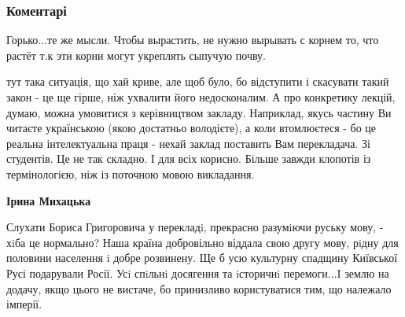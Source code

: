 
 
 
 
 
\subsubsection{Коментарі}
\label{sec:15_07_2021.fb.hersonskij_boris.1.mova_ksu_mnenie.cmt}

\begin{itemize}
 

Горько...те же мысли. Чтобы вырастить, не нужно вырывать с корнем то, что
растёт т.к эти корни могут укреплять сыпучую почву.


 

тут така ситуація, що хай криве, але щоб було, бо відступити і скасувати такий
закон - це ще гірше, ніж ухвалити його недосконалим. А про конкретику лекцій,
думаю, можна умовитися з керівництвом закладу. Наприклад, якусь частину Ви
читаєте українською (якою достатньо володієте), а коли втомлюєтеся - бо це
реальна інтелектуальна праця - нехай заклад поставить Вам перекладача. Зі
студентів. Це не так складно. І для всіх корисно. Більше завжди клопотів із
термінологією, ніж із поточною мовою викладання.

\begin{itemize}
 
\textbf{Ірина Михацька} 

Слухати Бориса Григоровича у перекладi, прекрасно разумiючи руську мову, - хiба
це нормально? Наша країна добровільно віддала свою другу мову, рiдну для
половини населення i добре розвинену. Ще б усю культурну спадщину Київської
Русі подарували Росії. Усi спiльнi досягення та iсторичнi перемоги...I землю на
додачу, якщо цього не вистаче, бо принизливо користуватися тим, що належало
імперії.



\end{itemize}
\end{itemize}
